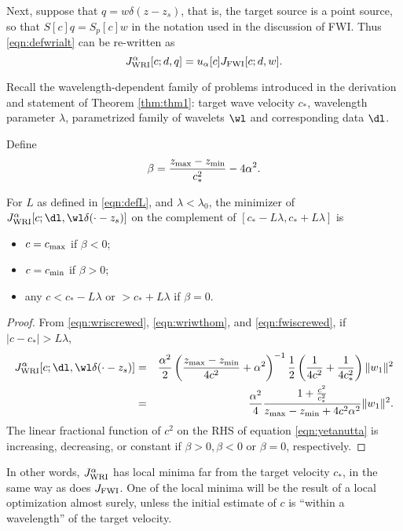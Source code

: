 Next, suppose that $q = w\delta(z-z_s)$, that is, the target source is
a point source, so that $S[c]q = S_p[c]w$ in the notation used in
the discussion of FWI. Thus \ref{eqn:defwrialt} can be re-written as
\begin{equation}
  \label{eqn:wriscrewed}
  J_{\rm WRI}^{\alpha}[c;d,q]=u_{\alpha}[c]J_{\rm FWI}[c;d,w].
\end{equation}

Recall the wavelength-dependent family of problems introduced in the derivation and
statement of Theorem \ref{thm:thm1}: target wave velocity $c_*$, wavelength parameter
$\lambda$, parametrized family of wavelets $\wl$ and corresponding
data $\dl$.

Define
\begin{equation}
   \label{eqn:defbeta}
\beta = \frac{z_{\rm max}-z_{\rm min}}{c_*^2} - 4 \alpha^2.
\end{equation}
\begin{theorem}
  \label{thm:thm2}
  For $L$ as defined in \ref{eqn:defL}, and $\lambda <
  \lambda_0$, the minimizer of $J_{\rm WRI}^{\alpha}[c;\dl,\wl \delta(\cdot-z_s)]$ on the
  complement of $[c_*-L\lambda, c_*+L\lambda]$ is
  \begin{itemize}
  \item $c=c_{\rm max}$ if $\beta<0$;
  \item $c=c_{\rm min}$ if $\beta>0$;
  \item any $c < c_*-L\lambda$ or $>c_*+L\lambda$ if $\beta=0$.
  \end{itemize}
\end{theorem}
\begin{proof}
  From \ref{eqn:wriscrewed}, \ref{eqn:wriwthom}, and
  \ref{eqn:fwiscrewed}, if $|c-c_*| > L\lambda$,
\begin{eqnarray}
    J_{\rm WRI}^{\alpha}[c;\dl,\wl\delta(\cdot-z_s)] &=&
    \frac{\alpha^2}{2}\left(\frac{z_{\rm max}-z_{\rm
          min}}{4c^2}+\alpha^2\right)^{-1}\frac{1}{2}\left(\frac{1}{4c^2}+\frac{1}{4c_*^2}\right)\|w_1\|^2\nonumber\\
   & =&    \frac{\alpha^2}{4}\frac{1+\frac{c^2}{c_*^2}}{z_{\rm 
        max}-z_{\rm min}+4c^2\alpha^2}\|w_1\|^2.
  \label{eqn:yetanutta}
\end{eqnarray}
  The linear fractional function of $c^2$ on the RHS of equation
  \ref{eqn:yetanutta} is increasing, decreasing,
  or constant if $\beta>0, \beta<0$ or $\beta=0$, respectively.
\end{proof}

In other words, $J_{\rm WRI}^{\alpha}$ has local minima far from the target
velocity $c_*$, in the same way as does $J_{\rm FWI}$. One of the
local minima will be the result of a local optimization almost surely,
unless the initial estimate of $c$ is ``within a wavelength'' of the
target velocity.


